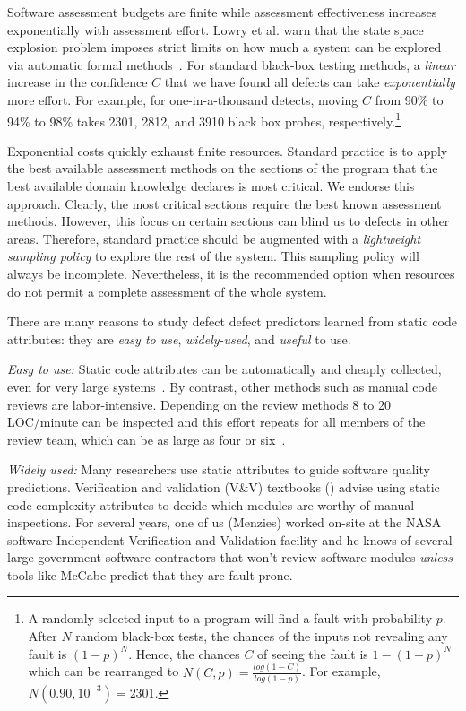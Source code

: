 
 
Software assessment budgets are finite
while assessment effectiveness increases 
exponentially with assessment effort.
Lowry et al. warn that  
the state space explosion problem imposes
strict limits on how much a system can be explored
via automatic formal methods~\cite{lowrey98}.
For standard black-box testing methods,
a {\em linear} increase
in the confidence $C$ that we have found all defects
can take {\em exponentially} more effort.
For example, for one-in-a-thousand detects,
moving $C$ from  
90\% to 94\% to 98\% takes 2301, 2812, and 3910 black box
probes, respectively.\footnote{A randomly selected 
input to a program will find a fault with probability $p$.
After $N$ random black-box tests, the chances of the inputs 
not revealing any fault 
is $(1-p)^N$. Hence, the chances $C$ of seeing the fault is $1-(1-p)^N$
which can be rearranged to 
 $N(C,p)=\frac{log(1 -
C)}{log(1-p)}$. For example, $N(0.90,10^{-3})=2301$.}

Exponential costs quickly exhaust finite resources.
Standard practice is to apply the best
available assessment methods on the sections of the program that the
best available domain knowledge declares is most critical.  We endorse
this approach.  Clearly, the most critical sections require the best
known assessment methods. However, this focus on certain sections
can blind us to defects in other areas.
Therefore, standard practice should be augmented
with a  {\em
lightweight sampling policy} to explore the rest of the system.  This
sampling policy will always be incomplete.
Nevertheless, it is the recommended option when
resources do not permit a complete assessment of the whole system.


There are many reasons to study defect  defect predictors learned from
static code attributes: they are   {\em easy to
use}, {\em widely-used}, and {\em useful} to use.

{\em Easy to use:} Static code attributes can be automatically and cheaply collected, even for very large systems~\cite{nagappan05}.
By contrast, 
other methods such as manual code reviews are labor-intensive.
Depending on the review methods 8 to 20 LOC/minute can be
inspected and this effort repeats for all members of the review team,
which can be as large as four or six~\cite{me02f}. 

{\em Widely used:} Many researchers use static attributes to guide software 
quality predictions.
Verification and validation (V\&V) textbooks
(\cite{rakitin01}) advise using static code complexity attributes
to decide which modules are worthy of manual inspections.  
For several  years, one of us (Menzies) worked on-site at the NASA software Independent Verification
and Validation facility
and he
knows of several large government software contractors that won't
review software modules {\em unless} tools like McCabe predict that
they are fault prone.  


